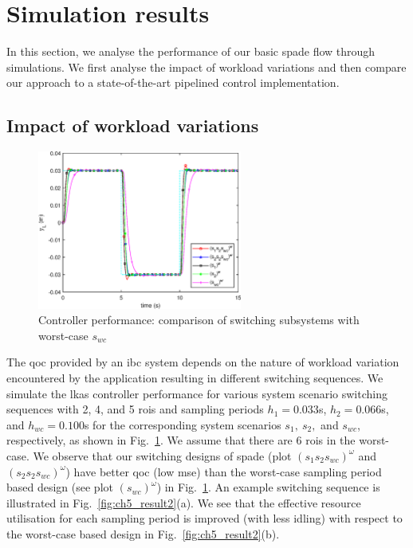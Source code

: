 \section{Simulation results}
In this section, we analyse the performance of our basic \gls{spade} flow through simulations. We first analyse the impact of workload variations and then compare our approach to a state-of-the-art pipelined control implementation.

\subsection{Impact of workload variations}
\label{sec:ch5_impact_workload}
\begin{figure}
            \centerline{\includegraphics[width=0.6\textwidth]{images/res_DSD.eps}}
            \vspace{-1ex}
            \caption{Controller performance: comparison of switching subsystems with worst-case $s_{wc}$}
            \label{fig:ch5_results}
            \vspace{-2ex}
\end{figure}
The \gls{qoc} provided by an \gls{ibc} system depends on the nature of workload variation encountered by the application resulting in different switching sequences. We simulate the \gls{lkas} controller performance for various system scenario switching sequences with 2, 4, and 5 \glspl{roi} and sampling periods $h_1=0.033$s, $h_2=0.066$s, and $h_{wc}=0.100$s for the corresponding system scenarios $s_1,\ s_2,$ and $s_{wc}$, respectively, as shown in Fig.~\ref{fig:ch5_results}.
We assume that there are 6 \glspl{roi} in the worst-case.
We observe that our switching designs of \gls{spade} (plot $(s_1 s_2 s_{wc})^\omega$ and $(s_2 s_2 s_{wc})^\omega$) have better \gls{qoc} (low \gls{mse}) than the worst-case sampling period based design (see plot $(s_{wc})^\omega$) in Fig.~\ref{fig:ch5_results}. An example switching sequence is illustrated in Fig.~\ref{fig:ch5_result2}(a). We see that the effective resource utilisation for each sampling period is improved (with less idling) with respect to the worst-case based design in Fig.~\ref{fig:ch5_result2}(b). 
